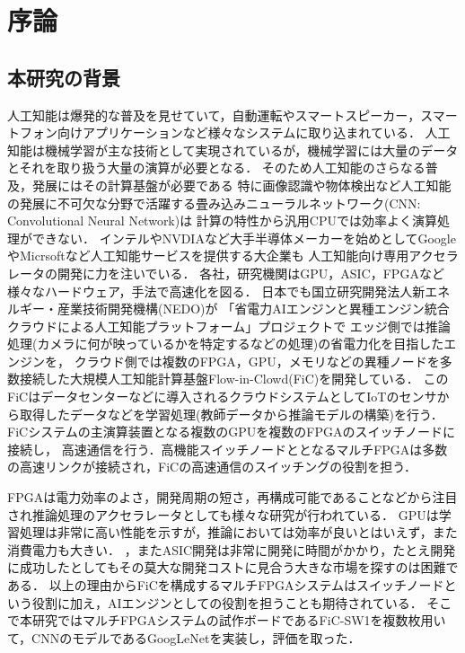 \chapter{序論}
{
  \label{chap:introducion}

  \section{本研究の背景}
  \label{sec:backgroud}
  人工知能は爆発的な普及を見せていて，自動運転やスマートスピーカー，スマートフォン向けアプリケーションなど様々なシステムに取り込まれている．
  人工知能は機械学習が主な技術として実現されているが，機械学習には大量のデータとそれを取り扱う大量の演算が必要となる．
  そのため人工知能のさらなる普及，発展にはその計算基盤が必要である
  特に画像認識や物体検出など人工知能の発展に不可欠な分野で活躍する畳み込みニューラルネットワーク(CNN: Convolutional Neural Network)は
  計算の特性から汎用CPUでは効率よく演算処理ができない．
  インテルやNVDIAなど大手半導体メーカーを始めとしてGoogleやMicrsoftなど人工知能サービスを提供する大企業も
  人工知能向け専用アクセラレータの開発に力を注いでいる．
  各社，研究機関はGPU，ASIC，FPGAなど様々なハードウェア，手法で高速化を図る．
  日本でも国立研究開発法人新エネルギー・産業技術開発機構(NEDO)が
  「省電力AIエンジンと異種エンジン統合クラウドによる人工知能プラットフォーム」プロジェクトで
  エッジ側では推論処理(カメラに何が映っているかを特定するなどの処理)の省電力化を目指したエンジンを，
  クラウド側では複数のFPGA，GPU，メモリなどの異種ノードを多数接続した大規模人工知能計算基盤Flow-in-Clowd(FiC)を開発している．
  このFiCはデータセンターなどに導入されるクラウドシステムとしてIoTのセンサから取得したデータなどを学習処理(教師データから推論モデルの構築)を行う．
  FiCシステムの主演算装置となる複数のGPUを複数のFPGAのスイッチノードに接続し，
  高速通信を行う．高機能スイッチノードととなるマルチFPGAは多数の高速リンクが接続され，FiCの高速通信のスイッチングの役割を担う．

  FPGAは電力効率のよさ，開発周期の短さ，再構成可能であることなどから注目され推論処理のアクセラレータとしても様々な研究が行われている．
  GPUは学習処理は非常に高い性能を示すが，推論においては効率が良いとはいえず，また消費電力も大きい．
  ，またASIC開発は非常に開発に時間がかかり，たとえ開発に成功したとしてもその莫大な開発コストに見合う大きな市場を探すのは困難である．
  以上の理由からFiCを構成するマルチFPGAシステムはスイッチノードという役割に加え，AIエンジンとしての役割を担うことも期待されている．
  そこで本研究ではマルチFPGAシステムの試作ボードであるFiC-SW1を複数枚用いて，CNNのモデルであるGoogLeNet\cite{googlenet}を実装し，評価を取った．

}
